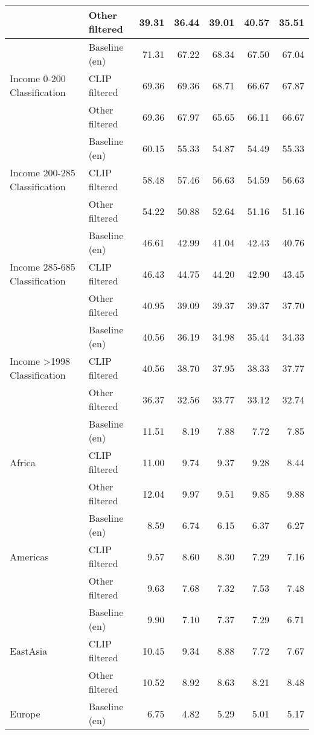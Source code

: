 {\begin{longtable}{l|l|rrrrr}
 & Other filtered & 39.31 & 36.44 & 39.01 & 40.57 & 35.51 \\
\midrule
\multirow[t]{3}{*}{Income 0-200 Classification} & Baseline (en) & 71.31 & 67.22 & 68.34 & 67.50 & 67.04 \\
 & CLIP filtered & 69.36 & 69.36 & 68.71 & 66.67 & 67.87 \\
 & Other filtered & 69.36 & 67.97 & 65.65 & 66.11 & 66.67 \\
\midrule
\multirow[t]{3}{*}{Income 200-285 Classification} & Baseline (en) & 60.15 & 55.33 & 54.87 & 54.49 & 55.33 \\
 & CLIP filtered & 58.48 & 57.46 & 56.63 & 54.59 & 56.63 \\
 & Other filtered & 54.22 & 50.88 & 52.64 & 51.16 & 51.16 \\
\midrule
\multirow[t]{3}{*}{Income 285-685 Classification} & Baseline (en) & 46.61 & 42.99 & 41.04 & 42.43 & 40.76 \\
 & CLIP filtered & 46.43 & 44.75 & 44.20 & 42.90 & 43.45 \\
 & Other filtered & 40.95 & 39.09 & 39.37 & 39.37 & 37.70 \\
\midrule
\multirow[t]{3}{*}{Income \textgreater1998 Classification} & Baseline (en) & 40.56 & 36.19 & 34.98 & 35.44 & 34.33 \\
 & CLIP filtered & 40.56 & 38.70 & 37.95 & 38.33 & 37.77 \\
 & Other filtered & 36.37 & 32.56 & 33.77 & 33.12 & 32.74 \\
\midrule
\multirow[t]{3}{*}{Africa} & Baseline (en) & 11.51 & 8.19 & 7.88 & 7.72 & 7.85 \\
 & CLIP filtered & 11.00 & 9.74 & 9.37 & 9.28 & 8.44 \\
 & Other filtered & 12.04 & 9.97 & 9.51 & 9.85 & 9.88 \\
\midrule
\multirow[t]{3}{*}{Americas} & Baseline (en) & 8.59 & 6.74 & 6.15 & 6.37 & 6.27 \\
 & CLIP filtered & 9.57 & 8.60 & 8.30 & 7.29 & 7.16 \\
 & Other filtered & 9.63 & 7.68 & 7.32 & 7.53 & 7.48 \\
\midrule
\multirow[t]{3}{*}{EastAsia} & Baseline (en) & 9.90 & 7.10 & 7.37 & 7.29 & 6.71 \\
 & CLIP filtered & 10.45 & 9.34 & 8.88 & 7.72 & 7.67 \\
 & Other filtered & 10.52 & 8.92 & 8.63 & 8.21 & 8.48 \\
\midrule
\multirow[t]{3}{*}{Europe} & Baseline (en) & 6.75 & 4.82 & 5.29 & 5.01 & 5.17 \\

\end{longtable}}
